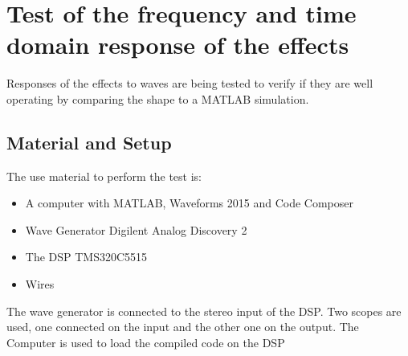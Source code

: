 \chapter{Test of the frequency and time domain response of the effects}

Responses of the effects to waves are being tested to verify if they are well operating by comparing the shape to a MATLAB simulation. 

\section*{Material and Setup}

The use material to perform the test is:

\begin{itemize}
	\item A computer with MATLAB, Waveforms 2015 and Code Composer
	\item Wave Generator Digilent Analog Discovery 2
	\item The DSP TMS320C5515
	\item Wires
\end{itemize}

The wave generator is connected to the stereo input of the DSP. Two scopes are used, one connected on the input and the other one on the output. The Computer is used to load the compiled code on the DSP 